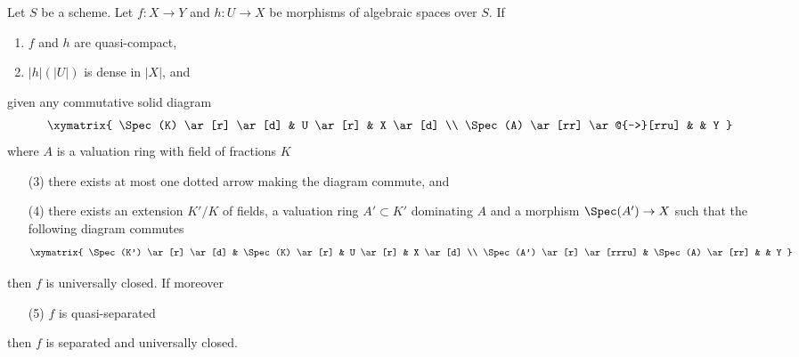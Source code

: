 \begin{lemma}
\label{lemma-refined-valuative-criterion-universally-closed}
Let $S$ be a scheme. Let $f : X \to Y$ and $h : U \to X$ be morphisms of
algebraic spaces over $S$. If
\begin{enumerate}
\item $f$ and $h$ are quasi-compact,
\item $|h|(|U|)$ is dense in $|X|$, and
\end{enumerate}
given any commutative solid diagram
$$
\xymatrix{
\Spec(K) \ar[r] \ar[d] & U \ar[r] & X \ar[d] \\
\Spec(A) \ar[rr] \ar@{-->}[rru] & & Y
}
$$
where $A$ is a valuation ring with field of fractions $K$
\begin{enumerate}
\item[(3)] there exists at most one dotted arrow making the diagram
commute, and
\item[(4)] there exists an extension $K'/K$ of fields, a
valuation ring $A' \subset K'$ dominating $A$ and a morphism
$\Spec(A') \to X$ such that the following diagram commutes
$$
\xymatrix{
\Spec(K') \ar[r] \ar[d] & \Spec(K) \ar[r] & U \ar[r] & X \ar[d] \\
\Spec(A') \ar[r] \ar[rrru] & \Spec(A) \ar[rr] & & Y
}
$$
\end{enumerate}
then $f$ is universally closed. If moreover
\begin{enumerate}
\item[(5)] $f$ is quasi-separated
\end{enumerate}
then $f$ is separated and universally closed.
\end{lemma}


